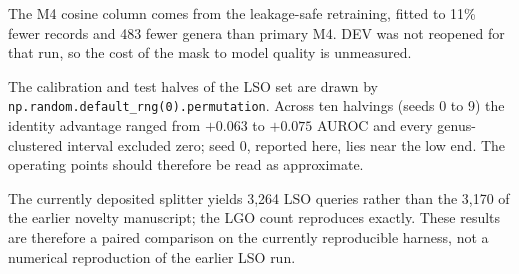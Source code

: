 \begin{table}[htbp]
\begin{threeparttable}
\begin{tablenotes}
\item The M4 cosine column comes from the leakage-safe retraining, fitted to 11\% fewer records and 483 fewer genera than primary M4. DEV was not reopened for that run, so the cost of the mask to model quality is unmeasured.
\item The calibration and test halves of the LSO set are drawn by \texttt{np.random.default\_rng(0).permutation}. Across ten halvings (seeds 0 to 9) the identity advantage ranged from $+0.063$ to $+0.075$ AUROC and every genus-clustered interval excluded zero; seed 0, reported here, lies near the low end. The operating points should therefore be read as approximate.
\item The currently deposited splitter yields 3,264 LSO queries rather than the 3,170 of the earlier novelty manuscript; the LGO count reproduces exactly. These results are therefore a paired comparison on the currently reproducible harness, not a numerical reproduction of the earlier LSO run.
\end{tablenotes}
\end{threeparttable}
\end{table}
